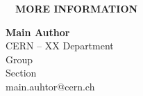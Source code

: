 \documentclass[
portrait,
a0paper%
]
{baposter}
\begin{document}
\begin{poster}
{\begin{minipage}[t][3.6cm]{.32\textwidth}
\begin{minipage}{.33\textwidth}
        \end{minipage}
        \begin{minipage}{.1\textwidth}
            \hspace{\textwidth}
        \end{minipage}
        \begin{minipage}{.33\textwidth}
            \begin{center}
            \end{center}
        \end{minipage}
        \begin{minipage}{.1\textwidth}
            \hspace{\textwidth}
        \end{minipage}
    \end{minipage}
    \hfill\vline\hfill
    \begin{minipage}[t][3.6cm]{.32\textwidth}
        \vspace{0.3cm}
        $\quad$\textbf{\small\color{cernblue}MORE INFORMATION} \vspace{0.15cm}\\
        \begin{minipage}{.35\textwidth}
            \begin{center}
            \end{center}
        \end{minipage}
        \begin{minipage}{.64\textwidth}
            \vspace{.3cm}
            \color{cernblue}
            \footnotesize
            \textbf{Main Author}\\
            CERN -- XX Department \\
            Group \\
            Section \\$\;$\\
            main.auhtor@cern.ch\\
        \end{minipage}
        \vspace{0.25cm}
        \color{cernblue}
        \small

\end{minipage}}
\end{poster}
\end{document}
